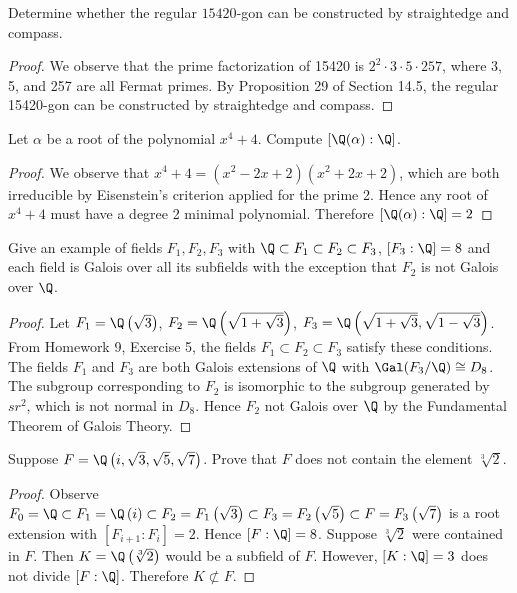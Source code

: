 \documentclass[10pt]{amsart}
\begin{document}
\begin{thm}
  \label{Ex2}
  Determine whether the regular $15420$-gon can be constructed by straightedge and compass.
  \begin{proof}
    We observe that the prime factorization of 15420 is $2^2 \cdot 3 \cdot 5 \cdot 257$, where 3, 5, and 257 are all Fermat primes.
    By Proposition 29 of Section 14.5, the regular 15420-gon can be constructed by straightedge and compass.
  \end{proof}
\end{thm}

\begin{thm}
  \label{Ex3}
  Let $\alpha$ be a root of the polynomial $x^4 + 4$.
  Compute $[\Q(\alpha):\Q]$.
  
  \begin{proof}
    We observe that $x^4 + 4 = (x^2 - 2x + 2)(x^2 + 2x + 2)$, which are both irreducible by Eisenstein's criterion applied for the prime 2.
    Hence any root of $x^4 + 4$ must have a degree 2 minimal polynomial.
    Therefore $[\Q(\alpha):\Q] = 2$
  \end{proof}
\end{thm}

\begin{thm}
  \label{Ex4}
  Give an example of fields $F_1, F_2, F_3$ with $\Q \subset F_1 \subset F_2 \subset F_3$, $[F_3 : \Q] = 8$ and each field is Galois over all its subfields with the exception that $F_2$ is not Galois over $\Q$.

  \begin{proof}
    Let $F_1 = \Q\left(\sqrt{3}\right)$, $F_2 = \Q\left(\sqrt{1 + \sqrt{3}}\right)$, $F_3 = \Q\left(\sqrt{1 + \sqrt{3}},\sqrt{1 - \sqrt{3}}\right)$.
    From Homework 9, Exercise 5, the fields $ F_1 \subset F_2 \subset F_3$ satisfy these conditions.
    The fields $F_1$ and $F_3$ are both Galois extensions of $\Q$ with $\Gal(F_3/\Q) \cong D_8$.
    The subgroup corresponding to $F_2$ is isomorphic to the subgroup generated by $sr^2$, which is not normal in $D_8$.
    Hence $F_2$ not Galois over $\Q$ by the Fundamental Theorem of Galois Theory.
    
  \end{proof}
\end{thm}

\begin{thm}
  \label{Ex5}
  Suppose $F = \Q\left(i, \sqrt{3}, \sqrt{5}, \sqrt{7}\right)$.
  Prove that $F$ does not contain the element $\sqrt[3]{2}$.
  
  \begin{proof}
    Observe $F_0 = \Q \subset F_1 = \Q\left(i\right) \subset F_2 = F_1\left(\sqrt{3}\right) \subset F_3 = F_2\left(\sqrt{5}\right) \subset F = F_3\left(\sqrt{7}\right)$ is a root extension with $[F_{i+1}:F_i] = 2$.
    Hence $[F:\Q] = 8$.
    Suppose $\sqrt[3]{2}$ were contained in $F$.  
    Then $K = \Q\left(\sqrt[3]{2}\right)$ would be a subfield of $F$.
    However, $[K:\Q] = 3$ does not divide $[F:\Q]$.
    Therefore $K \not \subset F$.
  \end{proof}
\end{thm}
\end{document}
